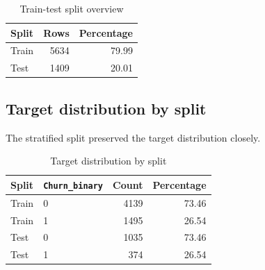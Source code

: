 \begin{table}[H]
\centering
\caption{Train-test split overview}
\begin{tabular}{lrr}
\toprule
Split & Rows & Percentage \\
\midrule
Train & 5634 & 79.99 \\
Test & 1409 & 20.01 \\
\bottomrule
\end{tabular}
\end{table}

\subsection{Target distribution by split}

The stratified split preserved the target distribution closely.

\begin{table}[H]
\centering
\caption{Target distribution by split}
\begin{tabular}{llrr}
\toprule
Split & \texttt{Churn\_binary} & Count & Percentage \\
\midrule
Train & 0 & 4139 & 73.46 \\
Train & 1 & 1495 & 26.54 \\
Test & 0 & 1035 & 73.46 \\
Test & 1 & 374 & 26.54 \\
\bottomrule
\end{tabular}
\end{table}